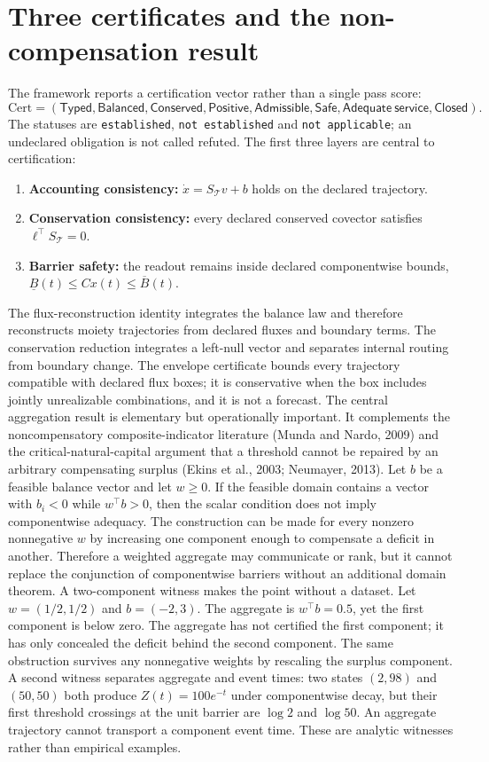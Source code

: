 \documentclass[11pt]{article}
\begin{document}
\section{Three certificates and the non-compensation result}
The framework reports a certification vector rather than a single pass score:
\[\mathrm{Cert}=(\mathsf{Typed},\mathsf{Balanced},\mathsf{Conserved},\mathsf{Positive},\mathsf{Admissible},\mathsf{Safe},\mathsf{Adequate\ service},\mathsf{Closed}).\]
The statuses are \texttt{established}, \texttt{not established} and \texttt{not applicable}; an undeclared obligation is not called refuted. The first three layers are central to certification:
\begin{enumerate}
\item \textbf{Accounting consistency:} \(\dot x=S_{\mathcal T}v+b\) holds on the declared trajectory.
\item \textbf{Conservation consistency:} every declared conserved covector satisfies \(\ell^\top S_{\mathcal T}=0\).
\item \textbf{Barrier safety:} the readout remains inside declared componentwise bounds, \(\underline B(t)\le Cx(t)\le\overline B(t)\).
\end{enumerate}
The flux-reconstruction identity integrates the balance law and therefore reconstructs moiety trajectories from declared fluxes and boundary terms. The conservation reduction integrates a left-null vector and separates internal routing from boundary change. The envelope certificate bounds every trajectory compatible with declared flux boxes; it is conservative when the box includes jointly unrealizable combinations, and it is not a forecast.
The central aggregation result is elementary but operationally important. It complements the noncompensatory composite-indicator literature (Munda and Nardo, 2009) and the critical-natural-capital argument that a threshold cannot be repaired by an arbitrary compensating surplus (Ekins et al., 2003; Neumayer, 2013). Let \(b\) be a feasible balance vector and let \(w\ge0\). If the feasible domain contains a vector with \(b_i<0\) while \(w^\top b>0\), then the scalar condition does not imply componentwise adequacy. The construction can be made for every nonzero nonnegative \(w\) by increasing one component enough to compensate a deficit in another. Therefore a weighted aggregate may communicate or rank, but it cannot replace the conjunction of componentwise barriers without an additional domain theorem.
A two-component witness makes the point without a dataset. Let \(w=(1/2,1/2)\) and \(b=(-2,3)\). The aggregate is \(w^\top b=0.5\), yet the first component is below zero. The aggregate has not certified the first component; it has only concealed the deficit behind the second component. The same obstruction survives any nonnegative weights by rescaling the surplus component. A second witness separates aggregate and event times: two states \((2,98)\) and \((50,50)\) both produce \(Z(t)=100e^{-t}\) under componentwise decay, but their first threshold crossings at the unit barrier are \(\log 2\) and \(\log 50\). An aggregate trajectory cannot transport a component event time. These are analytic witnesses rather than empirical examples.
\end{document}
